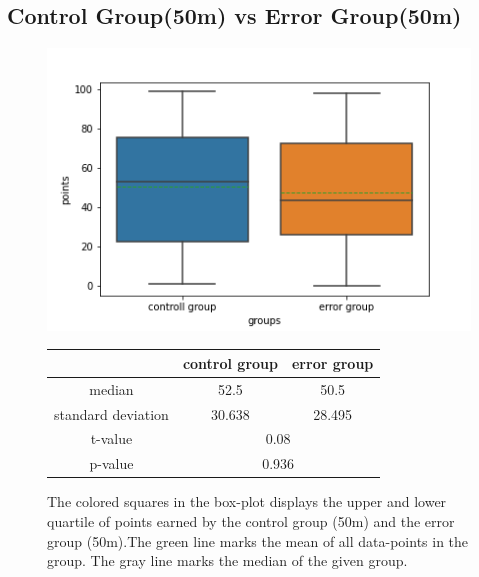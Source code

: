 \documentclass[runningheads]{llncs}
\begin{document}
\subsection{Control Group(50m) vs Error Group(50m) }
\begin{figure}[!h]
    \begin{minipage}{0.43\textwidth}        
        \includegraphics[width=\textwidth]{code/generate/all.png}
        \caption{The colored squares in the box-plot displays
        the upper and lower quartile of points earned by the control group (50m) and
        the error group (50m).The green line marks the mean of all data-points in the group.
        The gray line marks the median  of the given group.} \label{fig4}
    \end{minipage}
\hfill
\begin{minipage}{0.43\textwidth}
\begin{tabular}[]{| c | c | c |}
        \hline
        & control group & error group \\
        \hline
        median & 52.5&50.5 \\
        \hline
        standard deviation & 30.638&28.495 \\
        \hline
        t-value & \multicolumn{2}{c|}{0.08} \\
        \hline
        p-value & \multicolumn{2}{c|}{0.936} \\
        \hline            
\end{tabular}
\end{minipage}
\end{figure}
\end{document}
